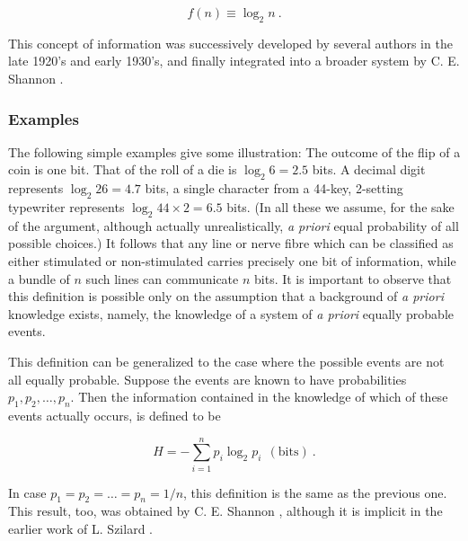 \documentclass[twocolumn,preprintnumbers,amsmath,amssymb,floatfix]{revtex4}
\begin{document}
\begin{equation}
f(n)\equiv \log_{2}{n}~.\label{eq:6}
\end{equation}

\noindent This concept of information was successively developed
by several authors in the late 1920's and early 1930's, and
finally integrated into a broader system by C. E. Shannon
\cite{Shannon48}.

\subsubsection{\label{sec:five2_2}Examples} The following simple
examples give some illustration: The outcome of the flip of a coin
is one bit. That of the roll of a die is $\log_{2}{6}=2.5$ bits. A
decimal digit represents $\log_{2}{26}=4.7$ bits, a single
character from a 44-key, 2-setting typewriter represents
$\log_{2}{44\times 2}=6.5$ bits. (In all these we assume, for the
sake of the argument, although actually unrealistically, \textit{a
priori} equal probability of all possible choices.) It follows
that any line or nerve fibre which can be classified as either
stimulated or non-stimulated carries precisely one bit of
information, while a bundle of $n$ such lines can communicate $n$
bits. It is important to observe that this definition is possible
only on the assumption that a background of \textit{a priori}
knowledge exists, namely, the knowledge of a system of \textit{a
priori} equally probable events.

This definition can be generalized to the case where the possible
events are not all equally probable. Suppose the events are known
to have probabilities $p_1, p_2, \ldots, p_n$. Then the
information contained in the knowledge of which of these events
actually occurs, is defined to be

\begin{equation}
H =
-\sum_{i=1}^{n}{p_i\log_{2}{p_i}}~~(\mathrm{bits})~.\label{eq:7}
\end{equation}

\noindent In case $p_1=p_2=\ldots = p_n = 1/n$, this definition is
the same as the previous one. This result, too, was obtained by C.
E. Shannon \cite{Shannon48}, although it is implicit in the
earlier work of L. Szilard \cite{Szilard29}.
\end{document}
